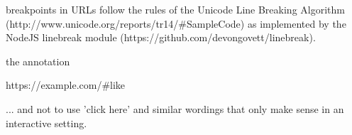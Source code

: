\mktsRuleSwell{}\vspace{\parskip}%
\begin{multicols}{2}\raggedcolumns{}



\begin{mktsEnNotes}{\mktsEnStyleMarkNotes{}\mktsEnMarkAfter{}}breakpoints in URLs follow the rules of the Unicode
Line Breaking Algorithm  ({\mktsStyleUrl{}http:\g/\g/\allowbreak{}www.unicode.org\g/\allowbreak{}reports\g/\allowbreak{}tr14\g/\allowbreak{}\#SampleCode\allowbreak{}}) as implemented by the
NodeJS {\mktsStyleCode{}linebreak} module ({\mktsStyleUrl{}https:\g/\g/\allowbreak{}github.com\g/\allowbreak{}devongovett\g/\allowbreak{}linebreak\allowbreak{}}).

{\mktsEnStyleMarkNotes{}\mktsEnMarkAfter{}}the annotation

{\mktsEnStyleMarkNotes{}\mktsEnMarkAfter{}}{\mktsStyleUrl{}https:\g/\g/\allowbreak{}example.com\g/\allowbreak{}\#like\allowbreak{}}

{\mktsEnStyleMarkNotes{}\mktsEnMarkAfter{}}... and not
to use 'click here' and similar wordings that only make sense in an interactive setting.

\end{mktsEnNotes}




\end{multicols}

